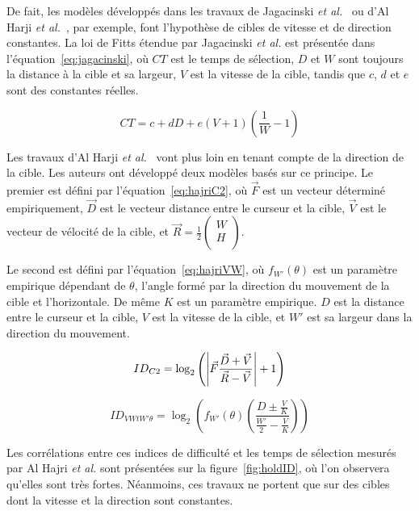 	De fait, les modèles développés dans les travaux de Jagacinski \emph{et al.}~\cite{jagacinski1980test} ou d'Al Harji \emph{et al.}~\cite{hajri2011moving}, par exemple, font l'hypothèse de cibles de vitesse et de direction constantes. La loi de Fitts étendue par Jagacinski \emph{et al.} est présentée dans l'équation~\ref{eq:jagacinski}, où $CT$ est le temps de sélection, $D$ et $W$ sont toujours la distance à la cible et sa largeur, $V$ est la vitesse de la cible, tandis que $c$, $d$ et $e$ sont des constantes réelles.
	
	\begin{equation}
		\label{eq:jagacinski}
		CT = c + dD + e(V + 1) \left(\frac{1}{W} - 1\right)
	\end{equation}
	
	Les travaux d'Al Harji \emph{et al.}~\cite{hajri2011moving} vont plus loin en tenant compte de la direction de la cible. Les auteurs ont développé deux modèles basés sur ce principe. Le premier est défini par l'équation~\ref{eq:hajriC2}, où $\vec{F}$ est un vecteur déterminé empiriquement, $\vec{D}$ est le vecteur distance entre le curseur et la cible, $\vec{V}$ est le vecteur de vélocité de la cible, et $\vec{R} = \frac{1}{2} \begin{pmatrix}
	W \\ H \\
	\end{pmatrix}$.
	
	Le second est défini par l'équation~\ref{eq:hajriVW}, où $f_{W'}(\theta)$ est un paramètre empirique dépendant de $\theta$, l'angle formé par la direction du mouvement de la cible et l'horizontale. De même $K$ est un paramètre empirique. $D$ est la distance entre le curseur et la cible, $V$ est la vitesse de la cible, et $W'$ est sa largeur dans la direction du mouvement.
	
	\begin{equation}
		\label{eq:hajriC2}
		ID_{C2} = \log_{2}\left(\abs*{\vec{F} \frac{\vec{D}+\vec{V}}{\vec{R}-\vec{V}}} + 1 \right)
	\end{equation}
	
	\begin{equation}
		\label{eq:hajriVW}
		ID_{VWtW'\theta} = \log_{2}\left( f_{W'}(\theta) \left( \frac{D \pm \frac{V}{K}}{\frac{W'}{2} - \frac{V}{K}} \right) \right)
	\end{equation}
	
	Les corrélations entre ces indices de difficulté et les temps de sélection mesurés par Al Hajri \emph{et al.} sont présentées sur la figure~\ref{fig:holdID}, où l'on observera qu'elles sont très fortes. Néanmoins, ces travaux ne portent que sur des cibles dont la vitesse et la direction sont constantes.
	
